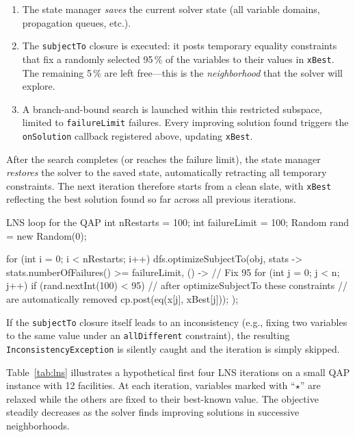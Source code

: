 \documentclass[11pt, a4paper]{scrartcl}
\begin{document}
\begin{enumerate}
    \item The state manager \emph{saves} the current solver state (all
          variable domains, propagation queues, etc.).
    \item The \texttt{subjectTo} closure is executed: it posts
          temporary equality constraints that fix a randomly selected
          95\,\% of the variables to their values in \texttt{xBest}.
          The remaining 5\,\% are left free---this is the
          \emph{neighborhood} that the solver will explore.
    \item A branch-and-bound search is launched within this restricted
          subspace, limited to \texttt{failureLimit} failures.
          Every improving solution found triggers the
          \texttt{onSolution} callback registered above, updating
          \texttt{xBest}.
\end{enumerate}

\noindent
After the search completes (or reaches the failure limit), the state
manager \emph{restores} the solver to the saved state, automatically
retracting all temporary constraints.
The next iteration therefore starts from a clean slate, with
\texttt{xBest} reflecting the best solution found so far across all
previous iterations.

\begin{codebox}[label={lst:qap-lns}]{LNS loop for the QAP}
int nRestarts = 100;
int failureLimit = 100;
Random rand = new Random(0);

for (int i = 0; i < nRestarts; i++) {
    dfs.optimizeSubjectTo(obj,
        stats -> stats.numberOfFailures() >= failureLimit,
        () -> {
            // Fix 95%
            for (int j = 0; j < n; j++) {
                if (rand.nextInt(100) < 95) {
                    // after optimizeSubjectTo these constraints
                    // are automatically removed
                    cp.post(eq(x[j], xBest[j]));
                }
            }
        }
    );
}
\end{codebox}

If the \texttt{subjectTo} closure itself leads to an inconsistency
(e.g., fixing two variables to the same value under an
\texttt{allDifferent} constraint), the resulting
\texttt{InconsistencyException} is silently caught and the iteration
is simply skipped.

Table~\ref{tab:lns} illustrates a hypothetical first four LNS iterations on a
small QAP instance with 12 facilities.
At each iteration, variables marked with ``$\star$'' are relaxed
while the others are fixed to their best-known value.
The objective steadily decreases as the solver finds improving
solutions in successive neighborhoods.
\end{document}
